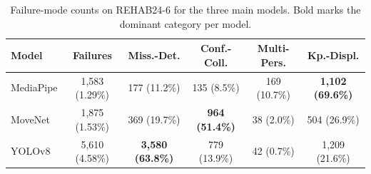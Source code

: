 \begin{table}[htbp]
  \centering
  \caption{Failure-mode counts on REHAB24-6 for the three main models. Bold marks the dominant category per model.}
  \label{tab:failure-mode-counts}
  \small
  \setlength{\tabcolsep}{4pt}
  \begin{tabular}{lccccc}
    \toprule
    Model & Failures & Miss.-Det. & Conf.-Coll. & Multi-Pers. & Kp.-Displ. \\
    \midrule
    MediaPipe & 1{,}583 (1.29\%) & 177 (11.2\%) & 135 (8.5\%) & 169 (10.7\%) & \textbf{1{,}102 (69.6\%)} \\
    MoveNet   & 1{,}875 (1.53\%) & 369 (19.7\%) & \textbf{964 (51.4\%)} & 38 (2.0\%) & 504 (26.9\%) \\
    YOLOv8    & 5{,}610 (4.58\%) & \textbf{3{,}580 (63.8\%)} & 779 (13.9\%) & 42 (0.7\%) & 1{,}209 (21.6\%) \\
    \bottomrule
  \end{tabular}
\end{table}
